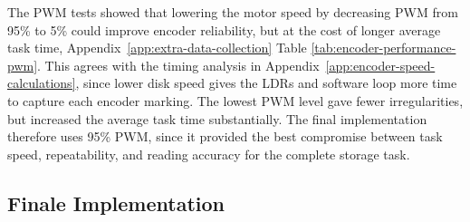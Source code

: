 
The PWM tests showed that lowering the motor speed by decreasing PWM from 95\% to 5\% could improve encoder reliability, but at the cost of longer average task time, Appendix~\ref{app:extra-data-collection} Table \ref{tab:encoder-performance-pwm}.
This agrees with the timing analysis in Appendix~\ref{app:encoder-speed-calculations}, since lower disk speed gives the LDRs and software loop more time to capture each encoder marking. The lowest PWM level gave fewer irregularities, but increased the average task time substantially. The final implementation therefore uses 95\% PWM, since it provided the best compromise between task speed, repeatability, and reading accuracy for the complete storage task.



\subsection{Finale Implementation}





